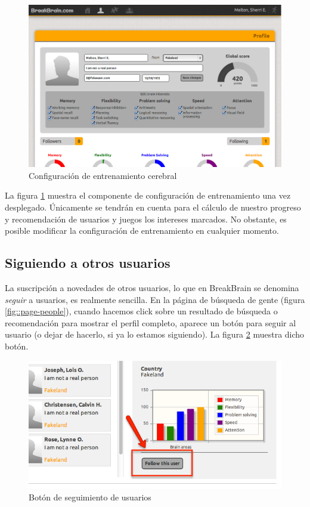 \begin{figure}[h]
  \begin{center}
    \includegraphics[width=\textwidth]{./images/training-settings.png}
  \end{center}  
  \caption{Configuración de entrenamiento cerebral}
  \label{fig::training-settings}
\end{figure}

La figura \ref{fig::training-settings} muestra el componente de configuración de entrenamiento una vez desplegado. Únicamente se tendrán en cuenta para el cálculo de nuestro progreso y recomendación de usuarios y juegos los intereses marcados. No obstante, es posible modificar la configuración de entrenamiento en cualquier momento.

\subsection{Siguiendo a otros usuarios}

La suscripción a novedades de otros usuarios, lo que en BreakBrain se denomina {\it seguir} a usuarios, es realmente sencilla. En la página de búsqueda de gente (figura \ref{fig::page-people}), cuando hacemos click sobre un resultado de búsqueda o recomendación para mostrar el perfil completo, aparece un botón para seguir al usuario (o dejar de hacerlo, si ya lo estamos siguiendo). La figura \ref{fig::follow-button} muestra dicho botón.

\begin{figure}[h]
  \begin{center}
    \includegraphics[width=\textwidth]{./images/follow-button.png}
  \end{center}  
  \caption{Botón de seguimiento de usuarios}
  \label{fig::follow-button}
\end{figure}

